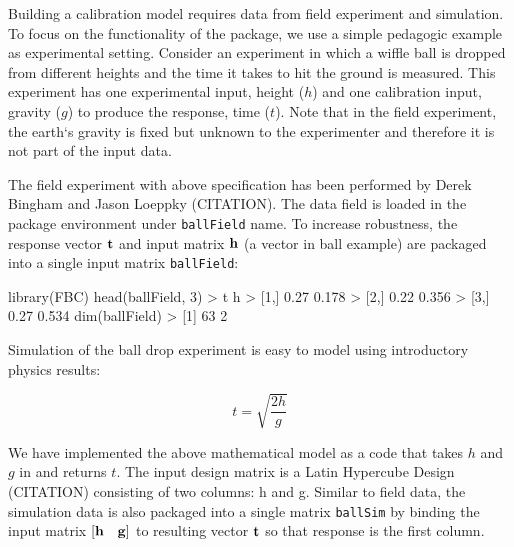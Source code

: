 \documentclass[
]{article}
\newenvironment{Shaded}{\begin{snugshade}}{\end{snugshade}}
\newcommand{\DecValTok}[1]{\textcolor[rgb]{0.00,0.00,0.81}{#1}}
\newcommand{\FloatTok}[1]{\textcolor[rgb]{0.00,0.00,0.81}{#1}}
\newcommand{\FunctionTok}[1]{\textcolor[rgb]{0.00,0.00,0.00}{#1}}
\newcommand{\NormalTok}[1]{#1}
\newcommand{\SpecialCharTok}[1]{\textcolor[rgb]{0.00,0.00,0.00}{#1}}
\begin{document}
Building a calibration model requires data from field experiment and
simulation. To focus on the functionality of the package, we use a
simple pedagogic example as experimental setting. Consider an experiment
in which a wiffle ball is dropped from different heights and the time it
takes to hit the ground is measured. This experiment has one
experimental input, height (\(h\)) and one calibration input, gravity
(\(g\)) to produce the response, time (\(t\)). Note that in the field
experiment, the earth`s gravity is fixed but unknown to the experimenter
and therefore it is not part of the input data.

The field experiment with above specification has been performed by
Derek Bingham and Jason Loeppky (CITATION). The data field is loaded in
the package environment under \texttt{ballField} name. To increase
robustness, the response vector \(\bf{t}\) and input matrix \(\bf{h}\)
(a vector in ball example) are packaged into a single input matrix
\texttt{ballField}:

\begin{Shaded}
\begin{Highlighting}[]
\FunctionTok{library}\NormalTok{(FBC)}
\FunctionTok{head}\NormalTok{(ballField, }\DecValTok{3}\NormalTok{)}
\SpecialCharTok{\textgreater{}}\NormalTok{         t     h}
\SpecialCharTok{\textgreater{}}\NormalTok{ [}\DecValTok{1}\NormalTok{,] }\FloatTok{0.27} \FloatTok{0.178}
\SpecialCharTok{\textgreater{}}\NormalTok{ [}\DecValTok{2}\NormalTok{,] }\FloatTok{0.22} \FloatTok{0.356}
\SpecialCharTok{\textgreater{}}\NormalTok{ [}\DecValTok{3}\NormalTok{,] }\FloatTok{0.27} \FloatTok{0.534}
\FunctionTok{dim}\NormalTok{(ballField)}
\SpecialCharTok{\textgreater{}}\NormalTok{ [}\DecValTok{1}\NormalTok{] }\DecValTok{63}  \DecValTok{2}
\end{Highlighting}
\end{Shaded}

Simulation of the ball drop experiment is easy to model using
introductory physics results:

\[
t = \sqrt{\frac{2h}{g}}
\]

We have implemented the above mathematical model as a code that takes
\(h\) and \(g\) in and returns \(t\). The input design matrix is a Latin
Hypercube Design (CITATION) consisting of two columns: h and g. Similar
to field data, the simulation data is also packaged into a single matrix
\texttt{ballSim} by binding the input matrix \([\bf{h} \quad \bf{g}]\)
to resulting vector \(\bf{t}\) so that response is the first column.
\end{document}
